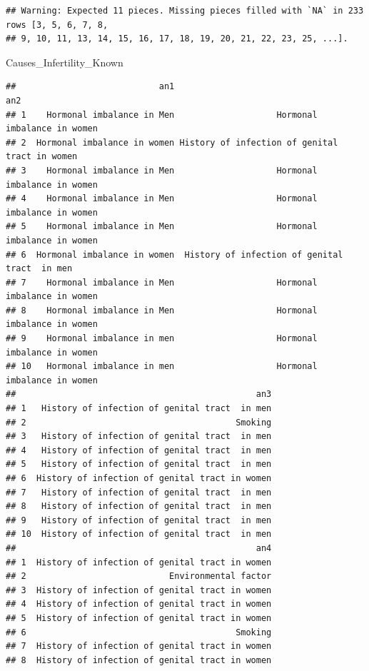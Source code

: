\documentclass[
]{article}
\newenvironment{Shaded}{\begin{snugshade}}{\end{snugshade}}
\newcommand{\NormalTok}[1]{#1}
\begin{document}
\begin{verbatim}
## Warning: Expected 11 pieces. Missing pieces filled with `NA` in 233 rows [3, 5, 6, 7, 8,
## 9, 10, 11, 13, 14, 15, 16, 17, 18, 19, 20, 21, 22, 23, 25, ...].
\end{verbatim}

\begin{Shaded}
\begin{Highlighting}[]
\NormalTok{Causes\_Infertility\_Known}
\end{Highlighting}
\end{Shaded}

\begin{verbatim}
##                            an1                                            an2
## 1    Hormonal imbalance in Men                    Hormonal imbalance in women
## 2  Hormonal imbalance in women History of infection of genital tract in women
## 3    Hormonal imbalance in Men                    Hormonal imbalance in women
## 4    Hormonal imbalance in Men                    Hormonal imbalance in women
## 5    Hormonal imbalance in Men                    Hormonal imbalance in women
## 6  Hormonal imbalance in women  History of infection of genital tract  in men
## 7    Hormonal imbalance in Men                    Hormonal imbalance in women
## 8    Hormonal imbalance in Men                    Hormonal imbalance in women
## 9    Hormonal imbalance in men                    Hormonal imbalance in women
## 10   Hormonal imbalance in men                    Hormonal imbalance in women
##                                               an3
## 1   History of infection of genital tract  in men
## 2                                         Smoking
## 3   History of infection of genital tract  in men
## 4   History of infection of genital tract  in men
## 5   History of infection of genital tract  in men
## 6  History of infection of genital tract in women
## 7   History of infection of genital tract  in men
## 8   History of infection of genital tract  in men
## 9   History of infection of genital tract  in men
## 10  History of infection of genital tract  in men
##                                               an4
## 1  History of infection of genital tract in women
## 2                            Environmental factor
## 3  History of infection of genital tract in women
## 4  History of infection of genital tract in women
## 5  History of infection of genital tract in women
## 6                                         Smoking
## 7  History of infection of genital tract in women
## 8  History of infection of genital tract in women

\end{verbatim}
\end{document}
